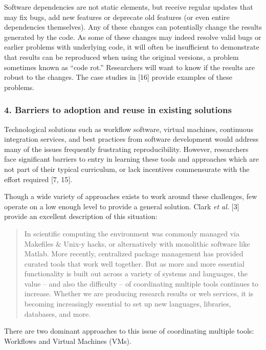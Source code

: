 \documentclass[9pt]{components/acm_proc_article-sp}
\begin{document}
Software dependencies are not static elements, but receive regular
updates that may fix bugs, add new features or deprecate old features
(or even entire dependencies themselves). Any of these changes can
potentially change the results generated by the code. As some of these
changes may indeed resolve valid bugs or earlier problems with
underlying code, it will often be insufficient to demonstrate that
results can be reproduced when using the original versions, a problem
sometimes known as ``code rot.'' Researchers will want to know if the
results are robust to the changes. The case studies in {[}16{]} provide
examples of these problems.

\subsubsection{4. \textbf{Barriers to adoption and reuse in existing
solutions}}\label{barriers-to-adoption-and-reuse-in-existing-solutions}

Technological solutions such as workflow software, virtual machines,
continuous integration services, and best practices from software
development would address many of the issues frequently frustrating
reproducibility. However, researchers face significant barriers to entry
in learning these tools and approaches which are not part of their
typical curriculum, or lack incentives commensurate with the effort
required {[}7, 15{]}.

Though a wide variety of approaches exists to work around these
challenges, few operate on a low enough level to provide a general
solution. Clark \emph{et al.} {[}3{]} provide an excellent description
of this situation:

\begin{quote}
In scientific computing the environment was commonly managed via
Makefiles \& Unix-y hacks, or alternatively with monolithic software
like Matlab. More recently, centralized package management has provided
curated tools that work well together. But as more and more essential
functionality is built out across a variety of systems and languages,
the value -- and also the difficulty -- of coordinating multiple tools
continues to increase. Whether we are producing research results or web
services, it is becoming increasingly essential to set up new languages,
libraries, databases, and more.
\end{quote}

There are two dominant approaches to this issue of coordinating multiple
tools: Workflows and Virtual Machines (VMs).
\end{document}
